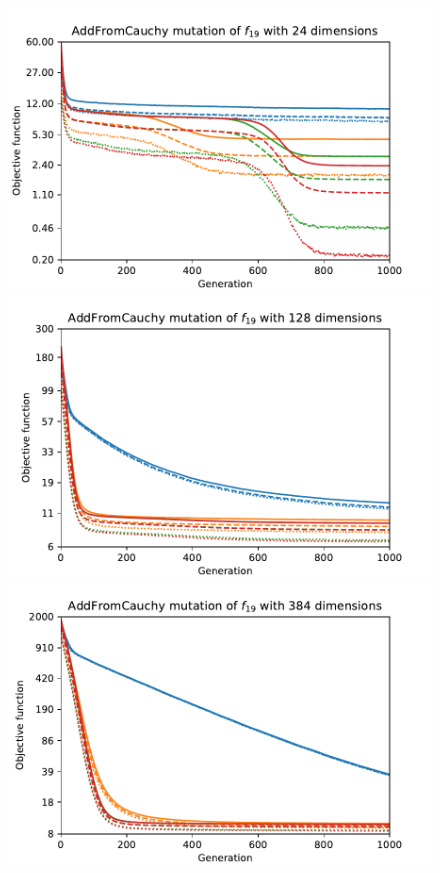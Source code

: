 \begin{figure}[ht!]
    \begin{minipage}[t]{0.32\textwidth}
        \centering
        \includegraphics[width=\textwidth]{img/runs/fitness_es_mutation_f19_dim24_AddFromCauchy.pdf}
    \end{minipage}
    \hfill
    \begin{minipage}[t]{0.32\textwidth}
        \centering
        \includegraphics[width=\textwidth]{img/runs/fitness_es_mutation_f19_dim128_AddFromCauchy.pdf}
    \end{minipage}
    \hfill
    \begin{minipage}[t]{0.32\textwidth}
        \centering
        \includegraphics[width=\textwidth]{img/runs/fitness_es_mutation_f19_dim384_AddFromCauchy.pdf}
    \end{minipage}


\end{figure}
